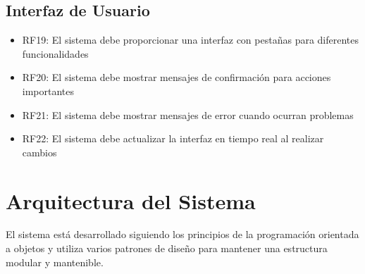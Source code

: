 \documentclass[12pt,letterpaper]{article}
\begin{document}
\subsection{Interfaz de Usuario}
\begin{itemize}
    \item RF19: El sistema debe proporcionar una interfaz con pestañas para diferentes funcionalidades
    \item RF20: El sistema debe mostrar mensajes de confirmación para acciones importantes
    \item RF21: El sistema debe mostrar mensajes de error cuando ocurran problemas
    \item RF22: El sistema debe actualizar la interfaz en tiempo real al realizar cambios
\end{itemize}

\section{Arquitectura del Sistema}
El sistema está desarrollado siguiendo los principios de la programación orientada a objetos y utiliza varios patrones de diseño para mantener una estructura modular y mantenible.
\end{document}
